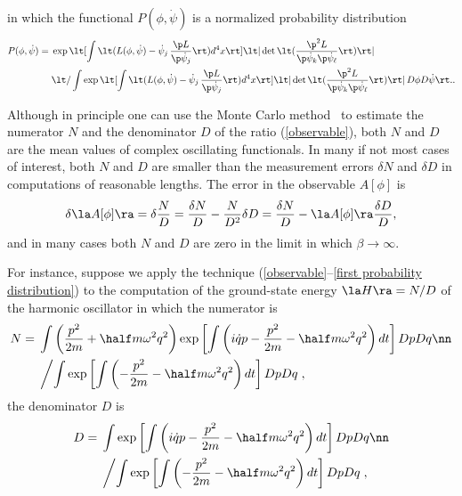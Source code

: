 \documentclass[prd,preprint,floatfix,showpacs]{revtex4-1}
\begin{document}
in which the functional \( P(\phi, \dot \psi) \)
is a normalized probability distribution
\begin{equation}
   \begin{split}
   P(\phi, \dot \psi) ={}&
\exp \lt[ \int  \lt( L(\phi, \dot \psi) 
-  \dot \psi_j  \, \frac{ \p  L }{ \p \dot \psi_j }  \rt)
 d^4x \rt] 
\lt| \det \lt( \frac{ \p^2  L }
 { \p \dot \psi_k \p \dot \psi_\ell }  \rt) \rt|
\\
{}& \lt / \int
 \exp \lt[ \int   \lt( L(\phi, \dot \psi) 
 -  \dot \psi_j \, \frac{ \p  L }{ \p \dot \psi_j }  \rt)
  d^4x \rt] 
\lt| \det \lt( \frac{ \p^2  L }
 { \p \dot \psi_k \p \dot \psi_\ell }  \rt) \rt|
 \, D\phi D\dot\psi  \rt. .
 \label {first probability distribution}
   \end{split}
\end{equation}
\par
Although in principle one can use
the Monte Carlo method~\cite{CahillXIV}
to estimate
the numerator \( N \) and the denominator \( D \)
of the ratio (\ref {observable}),
both \( N \) and  \( D \) are
the mean values of complex oscillating
functionals.
In many if not most cases 
of interest, both \( N \) and \( D \)
are smaller than the measurement errors 
\( \delta N \) and \( \delta D \) 
in computations of reasonable lengths.
The error in the observable \( A[\phi] \) is
\begin{equation}
\delta \la A[\phi] \ra ={}
\delta \frac{N}{D} = 
\frac{ \delta N }{D} - 
\frac{ N }{ D^2 } \delta D =
\frac{ \delta N }{D} -  \la A[\phi] \ra
\frac{ \delta D }{ D } ,
\label {error in N/D}
\end{equation}
and in many cases
both \( N \) and \( D \) are zero
in the limit in which \( \beta \to \infty \)\@.
\par
For instance, suppose we apply the technique
(\ref {observable}--\ref {first probability distribution})
to the computation of the ground-state energy
\( \la H \ra = N/D \)
of the harmonic oscillator
in which the numerator is
\begin{align} 
N = {}& \int \left(  \frac{p^2}{2m}
   + \half m \omega^2 q^2 \right)
   \exp\left[\int \left( i \dot q p - \frac{p^2}{2m}
   - \half m \omega^2 q^2 \right) dt \right] Dp Dq \nn\\
  {}& \left/  \int \exp \left[ \int  \left( - \frac{p^2}{2m}
   - \half m \omega^2 q^2 \right) dt \right]  Dp Dq \right. ,
   \label {computation of the numerator}
\end{align}
the denominator \( D\) is
\begin{align} 
D = {}& \int \exp\left[\int \left( i \dot q p - \frac{p^2}{2m}
   - \half m \omega^2 q^2 \right) dt \right] Dp Dq \nn\\
  {}& \left/  \int \exp \left[ \int  \left( - \frac{p^2}{2m}
   - \half m \omega^2 q^2 \right) dt \right]  Dp Dq \right. ,
   \label {computation of the denominator}
\end{align}
\end{document}
